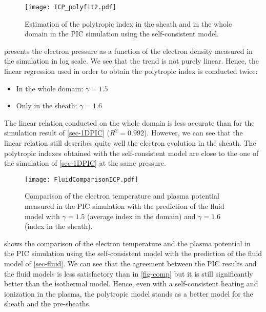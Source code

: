   \begin{figure}[!htbp]
    \centering
    \texttt{[image: ICP\_polyfit2.pdf]}
    \caption{Estimation of the polytropic index in the sheath and in the whole domain in the PIC simulation using the self-consistent model.}
    \label{fig-icpfit}
  \end{figure}

   presents the electron pressure as a function of the electron density measured in the simulation in log scale.
  We see that the trend is not purely linear. Hence, the linear regression used in order to obtain the polytropic index is conducted twice\string:
  \begin{itemize}
    \item In the whole domain\string: $\gamma=1.5$
    \item Only in the sheath\string: $\gamma=1.6$
  \end{itemize}
  The linear relation conducted on the whole domain is less accurate than for the simulation result of \cref{sec-1DPIC} ($R^2=0.992$).
  However, we can see that the linear relation still describes quite well the electron evolution in the sheath.
  The polytropic indexes obtained with the self-consistent model are close to the one of the simulation of \cref{sec-1DPIC} at the same pressure.

  \begin{figure}[!htbp]
    \centering
    \texttt{[image: FluidComparisonICP.pdf]}
    \caption{Comparison of the electron temperature and plasma potential measured in the PIC simulation with the prediction of the fluid model with $\gamma = 1.5$ (average index in the domain) and $\gamma=1.6$ (index in the sheath).}
    \label{fig-comp2}
  \end{figure}

   shows the comparison of the electron temperature and the plasma potential in the PIC simulation using the self-consistent model with the prediction of the fluid model of \cref{sec-fluid}.
  We can see that the agreement between the PIC results and the fluid models is less satisfactory than in \cref{fig-comp} but it is still significantly better than the isothermal model.
  Hence, even with a self-consistent heating and ionization in the plasma, the polytropic model stands as a better model for the sheath and the pre-sheaths.
